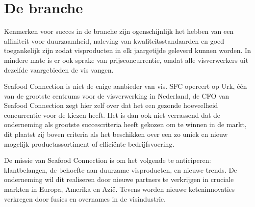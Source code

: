 \section{De branche}
Kenmerken voor succes in de branche zijn ogenschijnlijk het hebben van een affiniteit voor duurzaamheid, naleving van kwaliteitsstandaarden en goed toegankelijk zijn zodat visproducten in elk jaargetijde geleverd kunnen worden. In mindere mate is er ook sprake van prijsconcurrentie, omdat alle visverwerkers uit dezelfde vaargebieden de vis vangen. 

Seafood Connection is niet de enige aanbieder van vis. SFC opereert op Urk, één van de grootste centrums voor de visverwerking in Nederland, de CFO van Seafood Connection zegt hier zelf over dat het een gezonde hoeveelheid concurrentie voor de kiezen heeft. Het is dan ook niet verrassend dat de onderneming als grootste succescriteria heeft gekozen om te winnen in de markt, dit plaatst zij boven criteria als het beschikken over een zo uniek en nieuw mogelijk productassortiment of efficiënte bedrijfsvoering. 

De missie van Seafood Connection is om het volgende te anticiperen: klantbelangen, de behoefte aan duurzame visproducten, en nieuwe trends. De onderneming wil dit realiseren door nieuwe partners te verkrijgen in cruciale markten in Europa, Amerika en Azië. Tevens worden nieuwe keteninnovaties verkregen door fusies en overnames in de visindustrie. \citep{sfcwebsite}